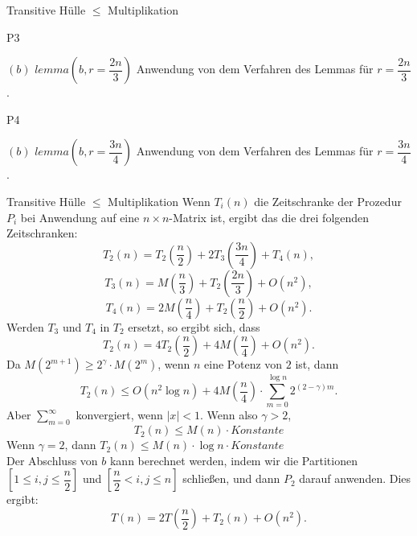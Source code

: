 \documentclass{beamer}
\begin{document}
	\begin{frame}{Transitive Hülle $\le$ Multiplikation}
		\begin{algorithm}[H]
			\caption[P3]{P3}
			\label{algorithm15}
			\begin{algorithmic}[1]
				\Require $(b)$
				\State $lemma(b, r = \dfrac{2n}{3})$ Anwendung von dem Verfahren des Lemmas für $r = \dfrac{2n}{3}$.
			\end{algorithmic}
		\end{algorithm} 
		
		\begin{algorithm}[H]
			\caption[P4]{P4}
			\label{algorithm16}
			\begin{algorithmic}[1]
				\Require $(b)$
				\State $lemma(b, r = \dfrac{3n}{4})$ Anwendung von dem Verfahren des Lemmas für $r = \dfrac{3n}{4}$.
			\end{algorithmic}
		\end{algorithm} 
	\end{frame}

	\begin{frame}{Transitive Hülle $\le$ Multiplikation}
			Wenn $T_i(n)$ die Zeitschranke der Prozedur $P_i$ bei Anwendung auf eine $n \times n$-Matrix ist, ergibt das die drei folgenden Zeitschranken:
		$$T_2(n) = T_2(\dfrac{n}{2}) + 2T_3(\dfrac{3n}{4}) + T_4(n),$$
		$$T_3(n) = M(\dfrac{n}{3}) + T_2(\dfrac{2n}{3}) + O(n^2),$$
		$$T_4(n) = 2M(\dfrac{n}{4}) + T_2(\dfrac{n}{2}) + O(n^2).$$
		Werden $T_3$ und $T_4$ in $T_2$ ersetzt, so ergibt sich, dass
		$$T_2(n) = 4T_2(\dfrac{n}{2}) + 4M(\dfrac{n}{4}) + O(n^2).$$
		Da $M(2^{m+1}) \ge 2^\gamma \cdot M(2^m)$, wenn $n$ eine Potenz von $2$ ist, dann
		$$T_2(n) \le O(n^2 \log n) + 4M(\dfrac{n}{4}) \cdot \sum_{m=0}^{\log n} 2^{(2-\gamma)m}.$$
		Aber $\sum_{m=0}^{\infty }$ konvergiert, wenn $|x| < 1$. Wenn also $\gamma  > 2$, 
		$$T_2(n) \le M(n) \cdot Konstante$$
		Wenn $\gamma = 2$, dann $T_2(n) \le M(n) \cdot \log n \cdot Konstante$\\
		Der Abschluss von $b$ kann berechnet werden, indem wir die Partitionen $[1 \le i,j\le \dfrac{n}{2}]$ und $[\dfrac{n}{2} < i, j \le n]$ schließen, und dann $P_2$ darauf anwenden. Dies ergibt:
		$$T(n) = 2T(\dfrac{n}{2}) + T_2(n) + O(n^2).$$
	\end{frame}
\end{document}
